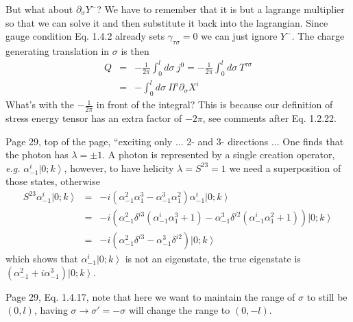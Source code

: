 \documentclass[aps,preprint,preprintnumbers,nofootinbib,showpacs,prd]{revtex4-1}
\newcommand{\eg}{{\it e.g.} }
\newcommand{\nbea}{\begin{eqnarray*}}
\newcommand{\neea}{\end{eqnarray*}}
\begin{document}
But what about $\partial_{\sigma}Y^-$? We have to remember that it is but a lagrange multiplier so that we can solve it and then substitute it back into the lagrangian. Since gauge condition Eq. 1.4.2 already sets $\gamma_{\tau\sigma} = 0$ we can just ignore $Y^-$. The charge generating translation in $\sigma$ is then
%
\nbea
Q & = & -\frac{1}{2\pi} \int_0^l d\sigma~ j^0 = -\frac{1}{2\pi} \int_0^l d\sigma~ T^{\tau\sigma} \\
& = & - \int_0^l d\sigma~\Pi^i \partial_{\sigma}X^i
\neea
%
What's with the $-\frac{1}{2\pi}$ in front of the integral? This is because our definition of stress energy tensor has an extra factor of $-2\pi$, see comments after Eq. 1.2.22.

Page 29, top of the page, ``exciting only ... 2- and 3- directions ... One finds that the photon has $\lambda=\pm1$. A photon is represented by a single creation operator, \eg $\alpha^i_{-1} \left . | 0 ; k \right \rangle$, however, to have helicity $\lambda = S^{23} = 1$ we need a superposition of those states, otherwise
%
\nbea
S^{23}\alpha^i_{-1} \left . | 0 ; k \right \rangle & = & -i (\alpha^2_{-1}\alpha^3_{1} - \alpha^3_{-1}\alpha^2_{1}) \alpha^i_{-1} \left . | 0 ; k \right \rangle \\
& = & -i ( \alpha^2_{-1} \delta^{i3} (\alpha^i_{-1}\alpha^3_{1} + 1) - \alpha^3_{-1}\delta^{i2} (\alpha^i_{-1}\alpha^2_{1} + 1) ) \left . | 0 ; k \right \rangle \\
& = & -i (\alpha^2_{-1}\delta^{i3} - \alpha^3_{-1}\delta^{i2} ) \left . | 0 ; k \right \rangle
\neea
%
which shows that $\alpha^i_{-1} \left . | 0 ; k \right \rangle$ is not an eigenstate, the true eigenstate is $(\alpha^2_{-1} + i \alpha^3_{-1}) \left . | 0 ; k \right \rangle$.

Page 29, Eq. 1.4.17, note that here we want to maintain the range of $\sigma$ to still be $(0,l)$, having $\sigma \rightarrow \sigma' = -\sigma$ will change the range to $(0,-l)$.
\end{document}
